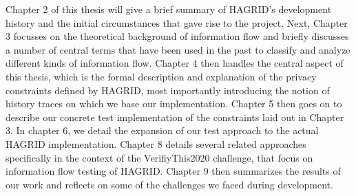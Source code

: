 Chapter 2 of this thesis will give a brief summary of HAGRID's development history and the initial circumstances that gave rise to the project. Next, Chapter 3 focusses on the theoretical background of information flow and briefly discusses a number of central terms that have been used in the past to classify and analyze different kinds of information flow.
Chapter 4 then handles the central aspect of this thesis, which is the formal description and explanation of the privacy constraints defined by HAGRID, most importantly introducing the notion of history traces on which we base our implementation. Chapter 5 then goes on to describe our concrete test implementation of the constraints laid out in Chapter 3. In chapter 6, we detail the expansion of our test approach to the actual HAGRID implementation.
Chapter 8 details several related approaches specifically in the context of the VerifiyThis2020 challenge, that focus on information flow testing of HAGRID.
Chapter 9 then summarizes the results of our work and reflects on some of the challenges we faced during development.

